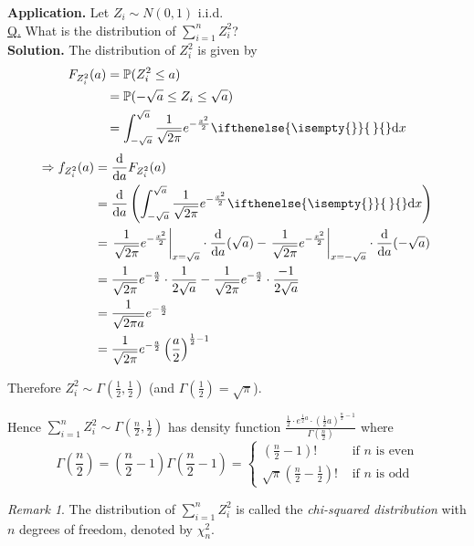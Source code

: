 \documentclass[a4paper,11pt]{amsbook}
\theoremstyle{definition}
\theoremstyle{remark}
\newtheorem{remark}{\hspace{-2em} \color{darkblue} Remark}[chapter]
\renewcommand{\P}{\mathbb{P}}
\newcommand\0{\varnothing}
\newcommand\dx[1][]{\ifthenelse{\isempty{#1}}{\,}{}\mathrm{d}x}
\newcommand\diff[2][]
{
    \frac{\mathrm{d}#1}{\mathrm{d}#2}
}
\begin{document}
    \noindent \textbf{Application.} Let $Z_i\sim N(0,1)$ i.i.d.\\
    \underline{Q.} What is the distribution of $\sum_{i=1}^nZ_i^2$?\\
    \textbf{Solution.} The distribution of $Z_i^2$ is given by \begin{align*}
        F_{Z_i^2}(a)&=\P(Z_i^2\leq a) \\
        &=\P(-\sqrt a\leq Z_i\leq\sqrt a) \\
        &=\int_{-\sqrt a}^{\sqrt a}\frac{1}{\sqrt{2\pi}}e^{-\frac{x^2}{2}}\dx
    \end{align*}
    \begin{align*}
        \Rightarrow f_{Z_i^2}(a)&=\diff{a}F_{Z_i^2}(a) \\
        &=\diff{a}\left(\int_{-\sqrt a}^{\sqrt a}\frac{1}{\sqrt{2\pi}}e^{-\frac{x^2}{2}}\dx\right) \\
        &=\left.\frac{1}{\sqrt{2\pi}}e^{-\frac{x^2}{2}}\right|_{x=\sqrt a}\cdot\diff{a}(\sqrt a)-\left.\frac{1}{\sqrt{2\pi}}e^{-\frac{x^2}{2}}\right|_{x=-\sqrt a}\cdot\diff{a}(-\sqrt a) \\
        &=\frac{1}{\sqrt{2\pi}}e^{-\frac{a}{2}}\cdot\frac{1}{2\sqrt a}-\frac{1}{\sqrt{2\pi}}e^{-\frac{a}{2}}\cdot\frac{-1}{2\sqrt a} \\
        &=\frac{1}{\sqrt{2\pi a}}e^{-\frac{a}{2}} \\
        &=\frac{1}{\sqrt{2\pi}}e^{-\frac{a}{2}}\left(\frac a2\right)^{\frac12-1}
    \end{align*}

    Therefore $Z_i^2\sim\Gamma\left(\frac12,\frac12\right)$ (and $\Gamma\left(\frac12\right)=\sqrt\pi$).

    Hence $\sum_{i=1}^nZ_i^2\sim\Gamma\left(\frac n2,\frac12\right)$ has density function
    $\frac{\frac12\cdot e^{\frac12a}\cdot\left(\frac12a\right)^{\frac n2-1}}{\Gamma\left(\frac n2\right)}$
    where $$\Gamma\left(\frac n2\right)=\left(\frac n2-1\right)\Gamma\left(\frac n2-1\right)=\begin{cases}
        \left(\frac n2-1\right)! & \text{ if }n\text{ is even} \\
        \sqrt\pi\left(\frac n2-\frac12\right)! & \text{ if }n\text{ is odd}
    \end{cases}$$

    \begin{remark} 
        The distribution of $\sum_{i=1}^nZ_i^2$ is called the \emph{chi-squared distribution} with $n$ degrees of freedom, denoted by $\chi^2_n$.
    \end{remark}
\end{document}

